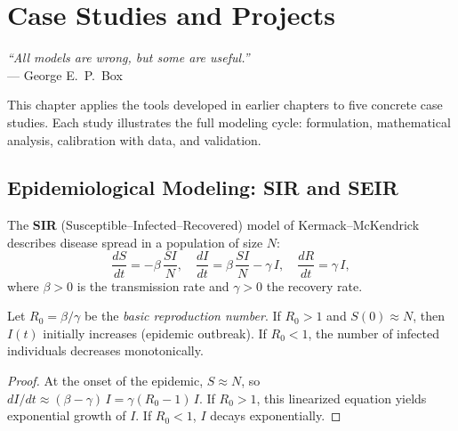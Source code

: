 \chapter{Case Studies and Projects}
\label{ch:case_studies}

\begin{center}
\textit{``All models are wrong, but some are useful.''}\\[4pt]
--- George E.\ P.\ Box
\end{center}

\bigskip

This chapter applies the tools developed in earlier chapters to five
concrete case studies. Each study illustrates the full modeling cycle:
formulation, mathematical analysis, calibration with data, and validation.

\section{Epidemiological Modeling: SIR and SEIR}
\label{sec:sir_seir}

\begin{definition}
The \textbf{SIR} (Susceptible--Infected--Recovered) model of
Kermack--McKendrick describes disease spread
in a population of size $N$:
\[
  \frac{dS}{dt} = -\beta\,\frac{SI}{N}, \quad
  \frac{dI}{dt} = \beta\,\frac{SI}{N} - \gamma\,I, \quad
  \frac{dR}{dt} = \gamma\,I,
\]
where $\beta > 0$ is the transmission rate and $\gamma > 0$ the recovery rate.
\end{definition}

\begin{theorem}
\label{thm:threshold_sir}
Let $R_0 = \beta/\gamma$ be the
\emph{basic reproduction number}. If $R_0 > 1$ and $S(0) \approx N$,
then $I(t)$ initially increases (epidemic outbreak). If $R_0 < 1$,
the number of infected individuals decreases monotonically.
\end{theorem}

\begin{proof}
At the onset of the epidemic, $S \approx N$, so
$dI/dt \approx (\beta - \gamma)\,I = \gamma(R_0 - 1)\,I$.
If $R_0 > 1$, this linearized equation yields exponential growth of $I$.
If $R_0 < 1$, $I$ decays exponentially.
\end{proof}


